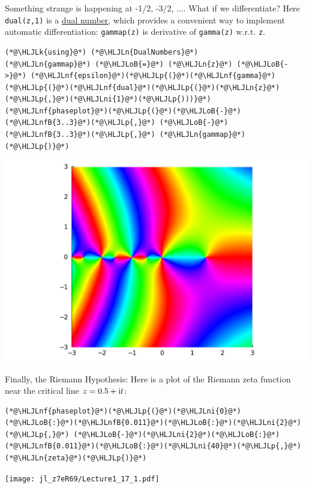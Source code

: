 \documentclass[12pt,a4paper]{article}
\newcommand{\HLJLk}[1]{\textcolor[RGB]{148,91,176}{\textbf{#1}}}
\newcommand{\HLJLn}[1]{#1}
\newcommand{\HLJLnf}[1]{\textcolor[RGB]{66,102,213}{#1}}
\newcommand{\HLJLnfB}[1]{\textcolor[RGB]{59,151,46}{#1}}
\newcommand{\HLJLni}[1]{\textcolor[RGB]{59,151,46}{#1}}
\newcommand{\HLJLoB}[1]{\textcolor[RGB]{102,102,102}{\textbf{#1}}}
\newcommand{\HLJLp}[1]{#1}
\def\I{ {\rm i} }
\begin{document}
Something strange is happening at -1/2, -3/2, .... What if we differentiate? Here \texttt{dual(z,1)} is a \href{https://en.wikipedia.org/wiki/Dual_number}{dual number}, which provides a convenient way to implement automatic differentiation: \texttt{gammap(z)} is derivative of \texttt{gamma(z)} w.r.t. \texttt{z}.


\begin{lstlisting}
(*@\HLJLk{using}@*) (*@\HLJLn{DualNumbers}@*)
(*@\HLJLn{gammap}@*) (*@\HLJLoB{=}@*) (*@\HLJLn{z}@*) (*@\HLJLoB{->}@*) (*@\HLJLnf{epsilon}@*)(*@\HLJLp{(}@*)(*@\HLJLnf{gamma}@*)(*@\HLJLp{(}@*)(*@\HLJLnf{dual}@*)(*@\HLJLp{(}@*)(*@\HLJLn{z}@*)(*@\HLJLp{,}@*)(*@\HLJLni{1}@*)(*@\HLJLp{)))}@*)
(*@\HLJLnf{phaseplot}@*)(*@\HLJLp{(}@*)(*@\HLJLoB{-}@*)(*@\HLJLnfB{3..3}@*)(*@\HLJLp{,}@*) (*@\HLJLoB{-}@*)(*@\HLJLnfB{3..3}@*)(*@\HLJLp{,}@*) (*@\HLJLn{gammap}@*)(*@\HLJLp{)}@*)
\end{lstlisting}

\includegraphics[width=\linewidth]{jl_z7eR69/Lecture1_16_1.pdf}

Finally, the Riemann Hypothesis: Here is a plot of the Riemann zeta function near the critical line $z = 0.5 + \I t$:


\begin{lstlisting}
(*@\HLJLnf{phaseplot}@*)(*@\HLJLp{(}@*)(*@\HLJLni{0}@*)(*@\HLJLoB{:}@*)(*@\HLJLnfB{0.011}@*)(*@\HLJLoB{:}@*)(*@\HLJLni{2}@*)(*@\HLJLp{,}@*) (*@\HLJLoB{-}@*)(*@\HLJLni{2}@*)(*@\HLJLoB{:}@*)(*@\HLJLnfB{0.011}@*)(*@\HLJLoB{:}@*)(*@\HLJLni{40}@*)(*@\HLJLp{,}@*) (*@\HLJLn{zeta}@*)(*@\HLJLp{)}@*)
\end{lstlisting}

\texttt{[image: jl\_z7eR69/Lecture1\_17\_1.pdf]}
\end{document}
